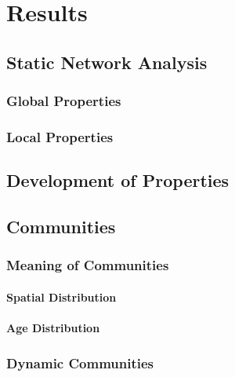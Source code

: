 \chapter{Results}

\section{Static Network Analysis}

\subsection{Global Properties}

\subsection{Local Properties}

\section{Development of Properties}

\section{Communities}

\subsection{Meaning of Communities}

\subsubsection{Spatial Distribution}

\subsubsection{Age Distribution}

\subsection{Dynamic Communities}